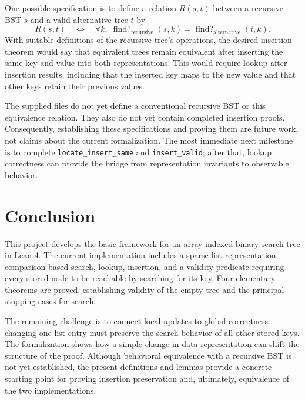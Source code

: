 \documentclass[10pt]{article}
\begin{document}
One possible specification is to define a relation $R(s,t)$ between a recursive BST $s$ and a valid alternative tree $t$ by
\[
  R(s,t)\quad\Longleftrightarrow\quad
  \forall k,\;\operatorname{find?}_{\mathrm{recursive}}(s,k)
      =\operatorname{find?}_{\mathrm{alternative}}(t,k).
\]
With suitable definitions of the recursive tree's operations, the desired insertion theorem would say that equivalent trees remain equivalent after inserting the same key and value into both representations. This would require lookup-after-insertion results, including that the inserted key maps to the new value and that other keys retain their previous values.

The supplied files do not yet define a conventional recursive BST or this equivalence relation. They also do not yet contain completed insertion proofs. Consequently, establishing these specifications and proving them are future work, not claims about the current formalization. The most immediate next milestone is to complete \texttt{locate\_insert\_same} and \texttt{insert\_valid}; after that, lookup correctness can provide the bridge from representation invariants to observable behavior.

\section{Conclusion}

This project develops the basic framework for an array-indexed binary search tree in Lean 4. The current implementation includes a sparse list representation, comparison-based search, lookup, insertion, and a validity predicate requiring every stored node to be reachable by searching for its key. Four elementary theorems are proved, establishing validity of the empty tree and the principal stopping cases for search.

The remaining challenge is to connect local updates to global correctness: changing one list entry must preserve the search behavior of all other stored keys. The formalization shows how a simple change in data representation can shift the structure of the proof. Although behavioral equivalence with a recursive BST is not yet established, the present definitions and lemmas provide a concrete starting point for proving insertion preservation and, ultimately, equivalence of the two implementations.


\newpage
\end{document}
